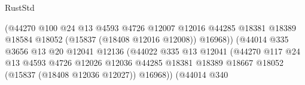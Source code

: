 \begin{lexlean}{RustStd}
\begin{coremodule}
                                                    (@44270
                                                      @100
                                                      @24
                                                      @13
                                                      @4593
                                                      @4726
                                                      @12007
                                                      @12016
                                                      @44285
                                                      @18381
                                                      @18389
                                                      @18584
                                                      @18052
                                                      (@15837 (@18408 @12016 @12008))
                                                      @16968))
                                                  (@44014
                                                    @335
                                                    @3656
                                                    @13
                                                    @20
                                                    @12041
                                                    @12136
                                                    (@44022
                                                      @335
                                                      @13
                                                      @12041
                                                      (@44270
                                                        @117
                                                        @24
                                                        @13
                                                        @4593
                                                        @4726
                                                        @12026
                                                        @12036
                                                        @44285
                                                        @18381
                                                        @18389
                                                        @18667
                                                        @18052
                                                        (@15837 (@18408 @12036 @12027))
                                                        @16968))
                                                    (@44014
                                                      @340

\end{coremodule}
\end{lexlean}
